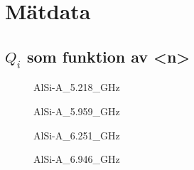 \documentclass[../../main.tex]{subfiles}
\begin{document}
\chapter{Mätdata}
\label{app:data}

\section{$Q_i$ som funktion av <n>}



\iffalse
\begin{figure}[H]
  \centering
  \setlength\figurewidth{0.8\textwidth}
  \setlength\figureheight{15em}
  
  \caption{AlSi-A\_4.953\_GHz x}
\end{figure}


\begin{figure}[H]
  \centering
  \setlength\figurewidth{0.8\textwidth}
  \setlength\figureheight{15em}
  
  \caption{AlSi-A\_5.006\_GHz x}
\end{figure}

\fi

\begin{figure}[H]
  \centering
  \setlength{}
  \setlength\figureheight{15em}
  
  \caption{AlSi-A\_5.218\_GHz}
\end{figure}


\iffalse
\begin{figure}[H]
  \centering
  \setlength\figurewidth{0.8\textwidth}
  \setlength\figureheight{15em}
  
  \caption{AlSi-A\_5.689\_GHz x}
\end{figure}
\fi

\begin{figure}[H]
  \centering
  \setlength{}
  \setlength\figureheight{15em}
  
  \caption{AlSi-A\_5.959\_GHz}
\end{figure}

\begin{figure}[H]
  \centering
  \setlength{}
  \setlength\figureheight{15em}
  
  \caption{AlSi-A\_6.251\_GHz}
\end{figure}

\begin{figure}[H]
  \centering
  \setlength{}
  \setlength\figureheight{15em}
  
  \caption{AlSi-A\_6.946\_GHz}
\end{figure}
\end{document}
